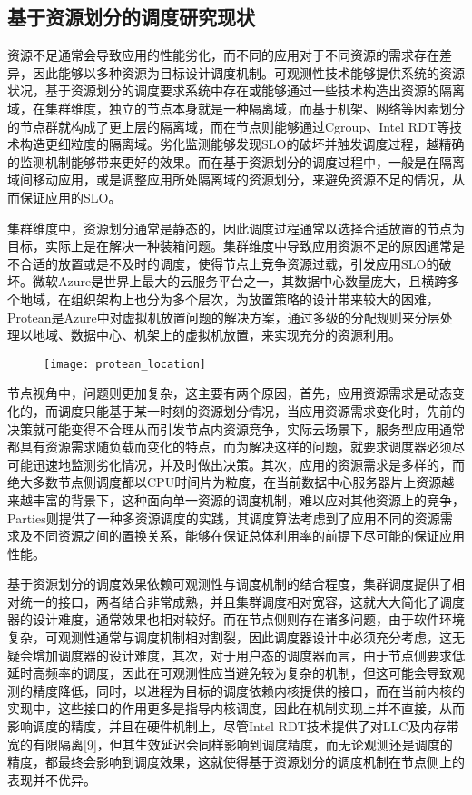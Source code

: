 \subsection{基于资源划分的调度研究现状}

资源不足通常会导致应用的性能劣化，而不同的应用对于不同资源的需求存在差异，因此能够以多种资源为目标设计调度机制\citep{delimitrou2014quasar, lo2015heracles}。可观测性技术能够提供系统的资源状况，基于资源划分的调度要求系统中存在或能够通过一些技术构造出资源的隔离域，在集群维度，独立的节点本身就是一种隔离域，而基于机架、网络等因素划分的节点群就构成了更上层的隔离域，而在节点则能够通过Cgroup、Intel RDT等技术构造更细粒度的隔离域。劣化监测能够发现SLO的破坏并触发调度过程，越精确的监测机制能够带来更好的效果。而在基于资源划分的调度过程中，一般是在隔离域间移动应用，或是调整应用所处隔离域的资源划分，来避免资源不足的情况，从而保证应用的SLO。

集群维度中，资源划分通常是静态的，因此调度过程通常以选择合适放置的节点为目标，实际上是在解决一种装箱问题。集群维度中导致应用资源不足的原因通常是不合适的放置或是不及时的调度，使得节点上竞争资源过载，引发应用SLO的破坏。微软Azure是世界上最大的云服务平台之一，其数据中心数量庞大，且横跨多个地域，在组织架构上也分为多个层次，为放置策略的设计带来较大的困难，Protean\citep{hadary2020protean}是Azure中对虚拟机放置问题的解决方案，通过多级的分配规则来分层处理以地域、数据中心、机架上的虚拟机放置，来实现充分的资源利用。

\begin{figure}[!htbp]
    \centering
    \texttt{[image: protean\_location]}
    \label{fig:protean_location}
\end{figure}

节点视角中，问题则更加复杂，这主要有两个原因，首先，应用资源需求是动态变化的，而调度只能基于某一时刻的资源划分情况，当应用资源需求变化时，先前的决策就可能变得不合理从而引发节点内资源竞争，实际云场景下，服务型应用通常都具有资源需求随负载而变化的特点，而为解决这样的问题，就要求调度器必须尽可能迅速地监测劣化情况，并及时做出决策。其次，应用的资源需求是多样的，而绝大多数节点侧调度都以CPU时间片为粒度，在当前数据中心服务器片上资源越来越丰富的背景下，这种面向单一资源的调度机制，难以应对其他资源上的竞争，Parties\citep{chen2019parties}则提供了一种多资源调度的实践，其调度算法考虑到了应用不同的资源需求及不同资源之间的置换关系，能够在保证总体利用率的前提下尽可能的保证应用性能。

基于资源划分的调度效果依赖可观测性与调度机制的结合程度，集群调度提供了相对统一的接口，两者结合非常成熟，并且集群调度相对宽容，这就大大简化了调度器的设计难度，通常效果也相对较好。而在节点侧则存在诸多问题，由于软件环境复杂，可观测性通常与调度机制相对割裂，因此调度器设计中必须充分考虑，这无疑会增加调度器的设计难度，其次，对于用户态的调度器而言，由于节点侧要求低延时高频率的调度，因此在可观测性应当避免较为复杂的机制，但这可能会导致观测的精度降低，同时，以进程为目标的调度依赖内核提供的接口，而在当前内核的实现中，这些接口的作用更多是指导内核调度，因此在机制实现上并不直接，从而影响调度的精度，并且在硬件机制上，尽管Intel RDT技术提供了对LLC及内存带宽的有限隔离[9]，但其生效延迟会同样影响到调度精度，而无论观测还是调度的精度，都最终会影响到调度效果，这就使得基于资源划分的调度机制在节点侧上的表现并不优异。

